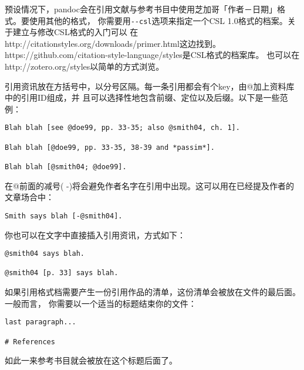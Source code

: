 \documentclass[fancyhdr,bookmark]{ctexbook}
\begin{document}
预设情况下，pandoc会在引用文献与参考书目中使用芝加哥「作者－日期」格式。要使用其他的格式，
你需要用\lstinline!--csl!选项来指定一个CSL
1.0格式的档案。关于建立与修改CSL格式的入门可以
在http://citationstyles.org/downloads/primer.html这边找到。
https://github.com/citation-style-language/styles是CSL格式的档案库。
也可以在http://zotero.org/styles以简单的方式浏览。

引用资讯放在方括号中，以分号区隔。每一条引用都会有个key，由@加上资料库中的引用ID组成，并
且可以选择性地包含前缀、定位以及后缀。以下是一些范例：

\begin{lstlisting}
Blah blah [see @doe99, pp. 33-35; also @smith04, ch. 1].

Blah blah [@doe99, pp. 33-35, 38-39 and *passim*].

Blah blah [@smith04; @doe99].
\end{lstlisting}

在@前面的减号(
-)将会避免作者名字在引用中出现。这可以用在已经提及作者的文章场合中：

\begin{lstlisting}
Smith says blah [-@smith04].
\end{lstlisting}

你也可以在文字中直接插入引用资讯，方式如下：

\begin{lstlisting}
@smith04 says blah.

@smith04 [p. 33] says blah.
\end{lstlisting}

如果引用格式档需要产生一份引用作品的清单，这份清单会被放在文件的最后面。一般而言，
你需要以一个适当的标题结束你的文件：

\begin{lstlisting}
last paragraph...

# References
\end{lstlisting}

如此一来参考书目就会被放在这个标题后面了。

\backmatter
\end{document}
